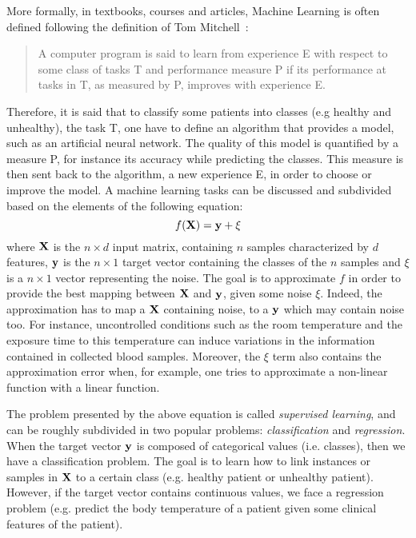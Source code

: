 More formally, in textbooks, courses and articles, Machine Learning is often
defined following the definition of Tom Mitchell~\cite{mitchell1997}:
\begin{quote}
	A computer program is said to learn from experience E with respect to some class of tasks T and performance measure P if its performance at tasks in T, as measured by P, improves with experience E.
\end{quote}
Therefore, it is said that to classify some patients into classes (e.g healthy and unhealthy), the task T, one have to define an algorithm that provides a model, such as an artificial neural network. The quality of this model is quantified by a measure P, for instance its accuracy while predicting the classes. This measure is then sent back to the algorithm, a new experience E, in order to choose or improve the model.
A machine learning tasks can be discussed and subdivided based on the elements
of the following equation:
\begin{equation*}
	f(\mathsf{\bf X}) = \mathsf{\bf y} + \xi
\end{equation*}
where $\mathsf{\bf X}$ is the $n \times d$ input matrix, containing $n$ samples
characterized by $d$ features, $\mathsf{\bf y}$ is the $n \times 1$ target
vector containing the classes of the $n$ samples and $\xi$ is a $n \times 1$
vector representing the noise. The goal is to approximate $f$ in order to
provide the best mapping between $\mathsf{\bf X}$ and $\mathsf{\bf y}$, given
some noise $\xi$. Indeed, the approximation has to map a $\mathsf{\bf X}$
containing noise, to a $\mathsf{\bf y}$ which may contain noise too. For
instance, uncontrolled conditions such as the room temperature and the exposure
time to this temperature can induce variations in the information contained in 
collected blood samples. Moreover, the $\xi$ term also contains the
approximation error when, for example, one tries to approximate a non-linear
function with a linear function.

The problem presented by the above equation is called \emph{supervised learning}, and can be roughly subdivided
in two popular problems: \emph{classification} and \emph{regression}.
When the target vector ${\bf y}$ is composed of categorical values (i.e. classes), then we have a
classification problem. The goal is to learn how to link instances or samples in
${\bf X}$ to a certain class (e.g. healthy patient or unhealthy patient).
However, if the target vector contains continuous values, we face a regression
problem (e.g. predict the body temperature of a patient given some clinical features of the
patient).

